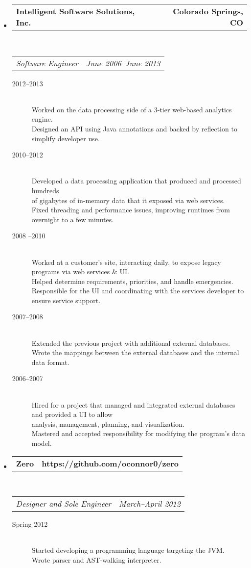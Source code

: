 \documentclass[10pt,letterpaper]{article}
\makeatletter
\newcommand{\headerrow}[2]
{\begin{tabular*}{\linewidth}{l@{\extracolsep{\fill}}r}
  #1 &
  #2 \\
\end{tabular*}}
\makeatother
\begin{document}
\begin{itemize}
  \item
  \headerrow
    {\textbf{Intelligent Software Solutions, Inc.}}
    {\textbf{Colorado Springs, CO}}
  \\
  \headerrow
    {\emph{Software Engineer}}
    {\emph{June 2006--June 2013}}
  \begin{description}
    \item[2012--2013] \hfill \\
        Worked on the data processing side of a 3-tier web-based analytics engine. \\
        Designed an API using Java annotations and backed by reflection to simplify developer use.
    \item[2010--2012] \hfill \\
        Developed a data processing application that produced and processed hundreds \\  of gigabytes of in-memory data that it exposed via web services. \\
        Fixed threading and performance issues, improving runtimes from overnight to a few minutes.
    \item[2008 --2010] \hfill \\
        Worked at a customer’s site, interacting daily, to expose legacy programs via web services \& UI. \\
        Helped determine requirements, priorities, and handle emergencies. \\
        Responsible for the UI and coordinating with the services developer to ensure service support.
    \item[2007--2008] \hfill \\
        Extended the previous project with additional external databases. \\
        Wrote the mappings between the external databases and the internal data format.
    \item[2006--2007] \hfill \\
        Hired for a project that managed and integrated external databases and provided a UI to allow \\ analysis, management, planning, and visualization. \\
        Mastered and accepted responsibility for modifying the program’s data model.
  \end{description}

  \item
  \headerrow
    {\textbf{Zero}}
    {\textbf{https://github.com/oconnor0/zero}}
  \\
  \headerrow
    {\emph{Designer and Sole Engineer}}
    {\emph{March--April 2012}}
  \begin{description}
    \item[Spring 2012] \hfill \\
      Started developing a programming language targeting the JVM. \\
      Wrote parser and AST-walking interpreter.
   \end{description}


\end{itemize}
\end{document}
